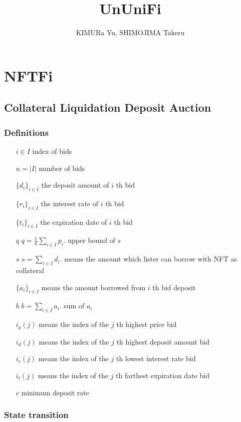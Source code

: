\documentclass[dvipdfmx]{jsarticle}
\title{UnUniFi}
\author{KIMURa Yu, SHIMOJIMA Takeru}
\begin{document}

\maketitle

\section{NFTFi}

\subsection{Collateral Liquidation Deposit Auction}

\subsubsection{Definitions}

\begin{itemize}
  \item[$i \in I$] index of bids
  \item[$n = |I|$] number of bids
  \item[$\{d_i\}_{i \in I}$] the deposit amount of $i$ th bid
  \item[$\{r_i\}_{i \in I}$] the interest rate of $i$ th bid
  \item[$\{t_i\}_{i \in I}$] the expiration date of $i$ th bid
  \item[$q$] $q = \frac{1}{n} \sum_{i \in I} p_i$. upper bound of $s$
  \item[$s$] $s = \sum_{i \in I} d_i$. means the amount which lister can borrow with NFT as collateral
  \item[$\{a_i\}_{i \in I}$] means the amount borrowed from $i$ th bid deposit
  \item[$b$] $b = \sum_{i \in I} a_i$. sum of $a_i$
  \item[$i_p(j)$] means the index of the $j$ th highest price bid
  \item[$i_d(j)$] means the index of the $j$ th highest deposit amount bid
  \item[$i_r(j)$] means the index of the $j$ th lowest interest rate bid
  \item[$i_t(j)$] means the index of the $j$ th farthest expiration date bid
  \item[$c$] minimum deposit rate
\end{itemize}

\subsubsection{State transition}
\end{document}
